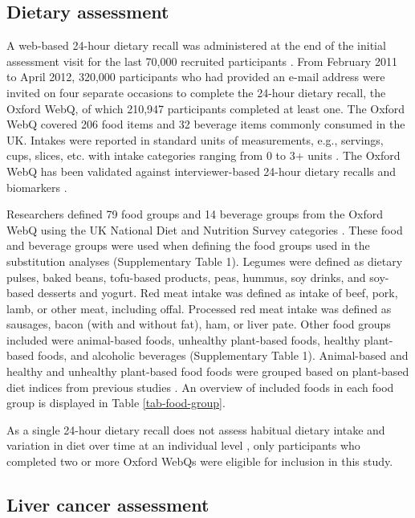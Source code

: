 \documentclass[nutrients,article,submit,moreauthors,pdftex]{Definitions/mdpi}
\begin{document}
\hypertarget{subsec2}{%
\subsection{Dietary assessment}\label{subsec2}}

A web-based 24-hour dietary recall was administered at the end of the
initial assessment visit for the last 70,000 recruited participants
\citep{RN115}. From February 2011 to April 2012, 320,000 participants
who had provided an e-mail address were invited on four separate
occasions to complete the 24-hour dietary recall, the Oxford WebQ, of
which 210,947 participants completed at least one. The Oxford WebQ
covered 206 food items and 32 beverage items commonly consumed in the
UK. Intakes were reported in standard units of measurements, e.g.,
servings, cups, slices, etc. with intake categories ranging from 0 to 3+
units \citep{piernas2021}. The Oxford WebQ has been validated against
interviewer-based 24-hour dietary recalls and biomarkers
\citep{Liu2011, Greenwood2019}.

Researchers defined 79 food groups and 14 beverage groups from the
Oxford WebQ using the UK National Diet and Nutrition Survey categories
\citep{piernas2021}. These food and beverage groups were used when
defining the food groups used in the substitution analyses
(Supplementary Table 1). Legumes were defined as dietary pulses, baked
beans, tofu-based products, peas, hummus, soy drinks, and soy-based
desserts and yogurt. Red meat intake was defined as intake of beef,
pork, lamb, or other meat, including offal. Processed red meat intake
was defined as sausages, bacon (with and without fat), ham, or liver
pate. Other food groups included were animal-based foods, unhealthy
plant-based foods, healthy plant-based foods, and alcoholic beverages
(Supplementary Table 1). Animal-based and healthy and unhealthy
plant-based food foods were grouped based on plant-based diet indices
from previous studies
\citep{Thompson2023, Heianza2021, Satija2017, Satija2016}. An overview
of included foods in each food group is displayed in Table
\ref{tab-food-group}.

As a single 24-hour dietary recall does not assess habitual dietary
intake and variation in diet over time at an individual level
\citep{thompson2013, gurinovic2017}, only participants who completed two
or more Oxford WebQs were eligible for inclusion in this study.

\hypertarget{subsec3}{%
\subsection{Liver cancer assessment}\label{subsec3}}
\end{document}
